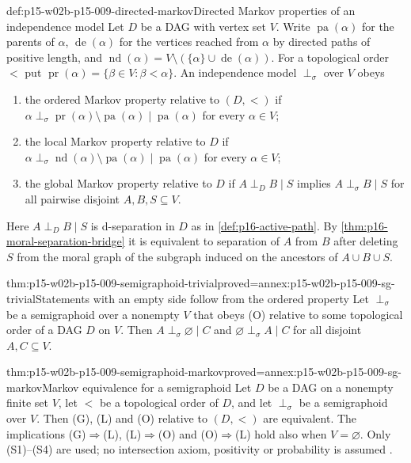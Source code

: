 \begin{hbdefinition}{def:p15-w02b-p15-009-directed-markov}{Directed Markov properties of an independence model}
Let \(D\) be a DAG with vertex set \(V\). Write \(\operatorname{pa}(\alpha)\)
for the parents of \(\alpha\), \(\operatorname{de}(\alpha)\) for the
vertices reached from \(\alpha\) by directed paths of positive length,
and \(\operatorname{nd}(\alpha)=V\setminus(\{\alpha\}\cup\operatorname{de}(\alpha))\).
For a topological order \(<\) put
\(\operatorname{pr}(\alpha)=\{\beta\in V:\beta<\alpha\}\).
An independence model \(\perp_\sigma\) over \(V\) obeys
\begin{enumerate}
\item[(O)] the ordered Markov property relative to \((D,<)\) if
  \(\alpha\perp_\sigma\operatorname{pr}(\alpha)\setminus\operatorname{pa}(\alpha)
   \mid\operatorname{pa}(\alpha)\) for every \(\alpha\in V\);
\item[(L)] the local Markov property relative to \(D\) if
  \(\alpha\perp_\sigma\operatorname{nd}(\alpha)\setminus\operatorname{pa}(\alpha)
   \mid\operatorname{pa}(\alpha)\) for every \(\alpha\in V\);
\item[(G)] the global Markov property relative to \(D\) if
  \(A\mathrel{\perp_D}B\mid S\) implies \(A\perp_\sigma B\mid S\)
  for all pairwise disjoint \(A,B,S\subseteq V\).
\end{enumerate}
Here \(A\mathrel{\perp_D}B\mid S\) is d-separation in \(D\) as in
\cref{def:p16-active-path}. By \cref{thm:p16-moral-separation-bridge}
it is equivalent to separation of \(A\) from \(B\) after deleting \(S\)
from the moral graph of the subgraph induced on the ancestors of
\(A\cup B\cup S\).
\end{hbdefinition}

\begin{hblemma}{thm:p15-w02b-p15-009-semigraphoid-trivial}{proved=annex:p15-w02b-p15-009-sg-trivial}{Statements with an empty side follow from the ordered property}
Let \(\perp_\sigma\) be a semigraphoid over a nonempty \(V\) that obeys
(O) relative to some topological order of a DAG \(D\) on \(V\). Then
\(A\perp_\sigma\varnothing\mid C\) and \(\varnothing\perp_\sigma A\mid C\)
for all disjoint \(A,C\subseteq V\).
\end{hblemma}

\begin{hbtheorem}{thm:p15-w02b-p15-009-semigraphoid-markov}{proved=annex:p15-w02b-p15-009-sg-markov}{Markov equivalence for a semigraphoid}
Let \(D\) be a DAG on a nonempty finite set \(V\), let \(<\) be a
topological order of \(D\), and let \(\perp_\sigma\) be a semigraphoid
over \(V\). Then (G), (L) and (O) relative to \((D,<)\) are
equivalent. The implications (G)\(\Rightarrow\)(L),
(L)\(\Rightarrow\)(O) and (O)\(\Rightarrow\)(L) hold also when
\(V=\varnothing\). Only (S1)--(S4) are used; no intersection axiom,
positivity or probability is assumed
\cite[Theorem~2.44, pp.~65--66]{Lauritzen2019GraphicalLectures2020}.
\end{hbtheorem}

